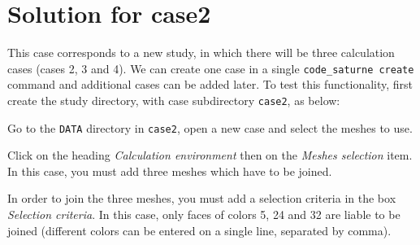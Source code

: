 
%
%
%
%


\section{Solution for case2}
This case corresponds to a new study, in which there will be three calculation
cases (cases 2, 3 and 4).
We can create one case in a single \texttt{code\_saturne create} command and
additional cases can be added later.
To test this functionality, first create the study directory, with case
subdirectory \texttt{case2}, as below:\\

Go to the \texttt{DATA} directory in \texttt{case2}, open a new case and select
the meshes to use.

Click on the heading {\itshape Calculation environment} then on the {\itshape Meshes selection} item.
In this case, you must add three meshes which have to be joined.

In order to join the three meshes, you must add a selection criteria in the
box {\itshape Selection criteria}. In this case, only faces of colors 5, 24 and 32
are liable to be joined (different colors can be entered on a single line, separated by comma).

